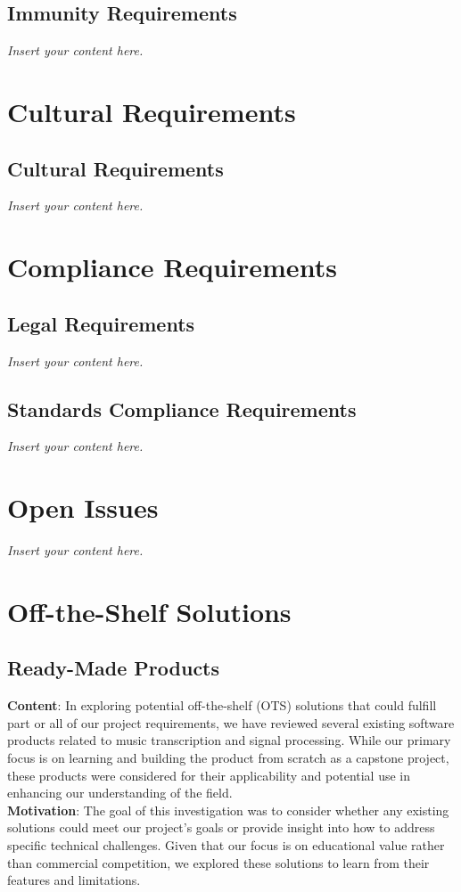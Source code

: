 \documentclass[12pt]{article}
\newcommand{\lips}{\textit{Insert your content here.}}
\begin{document}
\subsection{Immunity Requirements}
\lips

\section{Cultural Requirements}
\subsection{Cultural Requirements}
\lips

\section{Compliance Requirements}
\subsection{Legal Requirements}
\lips
\subsection{Standards Compliance Requirements}
\lips

\section{Open Issues}
\lips

\section{Off-the-Shelf Solutions}
\subsection{Ready-Made Products}
\textbf{Content}: In exploring potential off-the-shelf (OTS) solutions that could fulfill part or all of our project requirements, we have reviewed several existing software products related to music transcription and signal processing. While our primary focus is on learning and building the product from scratch as a capstone project, these products were considered for their applicability and potential use in enhancing our understanding of the field.\\
\textbf{Motivation}: The goal of this investigation was to consider whether any existing solutions could meet our project’s goals or provide insight into how to address specific technical challenges. Given that our focus is on educational value rather than commercial competition, we explored these solutions to learn from their features and limitations.\\
\end{document}
